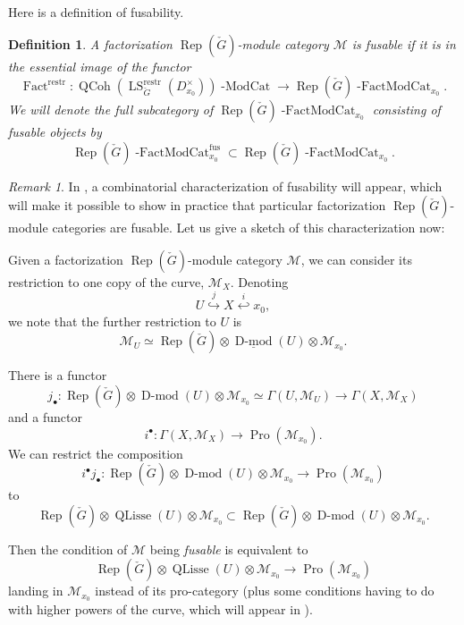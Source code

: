 \documentclass[10pt]{amsart}
\newtheorem{defn}[subsubsection]{Definition}
\theoremstyle{remark}
\newtheorem{rem}[subsubsection]{Remark}
\newcommand{\on}[1]{\operatorname{#1}}
\newcommand{\Dmod}{\on{D-mod}}
\newcommand{\QCoh}{\on{QCoh}}
\newcommand{\Gcheck}{\check{G}}
\newcommand{\sssec}[1]{\subsubsection{}}
\begin{document}
\sssec{}
Here is a definition of fusability.

\begin{defn}
    A factorization $\on{Rep}(\Gcheck)$-module category $\mathcal{M}$ is fusable if it is in the essential image of the functor
    $$
    \on{Fact}^{\on{restr}} : \QCoh(\on{LS}_{\Gcheck}^{\on{restr}}(D_{x_0}^{\times}))\on{-ModCat} \longrightarrow \on{Rep}(\Gcheck)\on{-FactModCat}_{x_0}.
    $$
    We will denote the full subcategory of $\on{Rep}(\Gcheck)\on{-FactModCat}_{x_0}$ consisting of fusable objects by
    $$
    \on{Rep}(\Gcheck)\on{-FactModCat}_{x_0}^{\on{fus}} \subset \on{Rep}(\Gcheck)\on{-FactModCat}_{x_0}.
    $$
\end{defn}

\begin{rem}
    In \cite{BCG}, a combinatorial characterization of fusability will appear, which will make it possible to show in practice that particular factorization $\on{Rep}(\Gcheck)$-module categories are fusable. Let us give a sketch of this characterization now:

    Given a factorization $\on{Rep}(\Gcheck)$-module category $\mathcal{M}$, we can consider its restriction to one copy of the curve, $\mathcal{M}_X$. Denoting
    $$
    U \overset{j}{\hookrightarrow} X \overset{i}{\hookleftarrow} x_0,
    $$
    we note that the further restriction to $U$ is
    $$
    \mathcal{M}_U \simeq \on{Rep}(\Gcheck) \otimes \underline{\Dmod}(U) \otimes \mathcal{M}_{x_0}.
    $$

    There is a functor
    $$
    j_{\bullet} : \on{Rep}(\Gcheck) \otimes \Dmod(U) \otimes \mathcal{M}_{x_0} \simeq \Gamma(U, \mathcal{M}_U) \longrightarrow \Gamma(X, \mathcal{M}_X)
    $$
    and a functor
    $$
    i^{\bullet} : \Gamma(X, \mathcal{M}_X) \longrightarrow \on{Pro}(\mathcal{M}_{x_0}).
    $$
    We can restrict the composition
    $$
    i^{\bullet} j_{\bullet} : \on{Rep}(\Gcheck) \otimes \Dmod(U) \otimes \mathcal{M}_{x_0} \to \on{Pro}(\mathcal{M}_{x_0})
    $$
    to
    $$
    \on{Rep}(\Gcheck) \otimes \on{QLisse}(U) \otimes \mathcal{M}_{x_0} \subset \on{Rep}(\Gcheck) \otimes \Dmod(U) \otimes \mathcal{M}_{x_0}.
    $$

    Then the condition of $\mathcal{M}$ being \emph{fusable} is equivalent to
    $$
    \on{Rep}(\Gcheck) \otimes \on{QLisse}(U) \otimes \mathcal{M}_{x_0} \longrightarrow \on{Pro}(\mathcal{M}_{x_0})
    $$
    landing in $\mathcal{M}_{x_0}$ instead of its pro-category (plus some conditions having to do with higher powers of the curve, which will appear in \cite{BCG}).
\end{rem}
\end{document}

